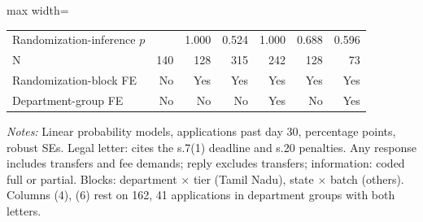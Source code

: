 \begin{table}[!htbp]
\begin{adjustbox}{max width=\textwidth}
\begin{threeparttable}
\begin{tabular}{lrrrrrr}
Randomization-inference $p$ &  & 1.000 & 0.524 & 1.000 & 0.688 & 0.596 \\
N & 140 & 128 & 315 & 242 & 128 & 73 \\
\midrule
Randomization-block FE & No & Yes & Yes & Yes & Yes & Yes \\
Department-group FE & No & No & No & Yes & No & Yes \\
\bottomrule
\end{tabular}
\begin{tablenotes}[flushleft]\footnotesize
\item \textit{Notes:} Linear probability models, applications past day 30, percentage points, robust SEs. Legal letter: cites the s.7(1) deadline and s.20 penalties. Any response includes transfers and fee demands; reply excludes transfers; information: coded full or partial. Blocks: department $\times$ tier (Tamil Nadu), state $\times$ batch (others). Columns (4), (6) rest on 162, 41 applications in department groups with both letters.
\end{tablenotes}
\end{threeparttable}
\end{adjustbox}
\end{table}
